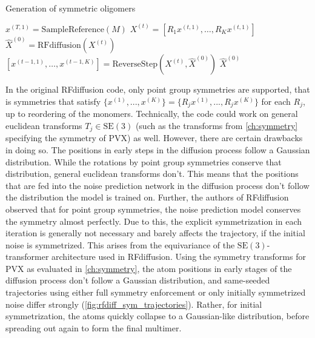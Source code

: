 \begin{algorithm}
    \caption{Generation of symmetric oligomers}
    \begin{algorithmic}[1]
    \State $x^{(T,1)} = \text{SampleReference}(M)$
        \State $X^{(t)} = [R_1 x^{(t,1)}, \ldots, R_K x^{(t,1)}]$
        \State $\hat{X}^{(0)} = \text{RFdiffusion}(X^{(t)})$
        \State $[x^{(t-1,1)}, \ldots, x^{(t-1,K)}] = \text{ReverseStep}(X^{(t)}, \hat{X}^{(0)})$
    \EndFor
    \State \Return $\hat{X}^{(0)}$
    \end{algorithmic}
    \label{alg:rfdiff}
\end{algorithm}

In the original RFdiffusion code, only point group symmetries are supported, that is symmetries that satisfy $\{x^{(1)}, ..., x^{(K)}\} = \{R_j x^{(1)}, ..., R_j x^{(K)}\}$ for each $R_j$, up to reordering of the monomers. Technically, the code could work on general euclidean transforms $T_j \in \mathrm{SE}(3)$ (such as the transforms from \autoref{ch:symmetry} specifying the symmetry of PVX) as well. However, there are certain drawbacks in doing so. The positions in early steps in the diffusion process follow a Gaussian distribution. While the rotations by point group symmetries conserve that distribution, general euclidean transforms don't. This means that the positions that are fed into the noise prediction network in the diffusion process don't follow the distribution the model is trained on. Further, the authors of RFdiffusion observed that for point group symmetries, the noise prediction model conserves the symmetry almost perfectly. Due to this, the explicit symmetrization in each iteration is generally not necessary and barely affects the trajectory, if the initial noise is symmetrized. This arises from the equivariance of the $\mathrm{SE}(3)$-transformer architecture used in RFdiffusion. Using the symmetry transforms for PVX as evaluated in \autoref{ch:symmetry}, the atom positions in early stages of the diffusion process don't follow a Gaussian distribution, and same-seeded trajectories using either full symmetry enforcement or only initially symmetrized noise differ strongly (\autoref{fig:rfdiff_sym_trajectories}). Rather, for initial symmetrization, the atoms quickly collapse to a Gaussian-like distribution, before spreading out again to form the final multimer.

